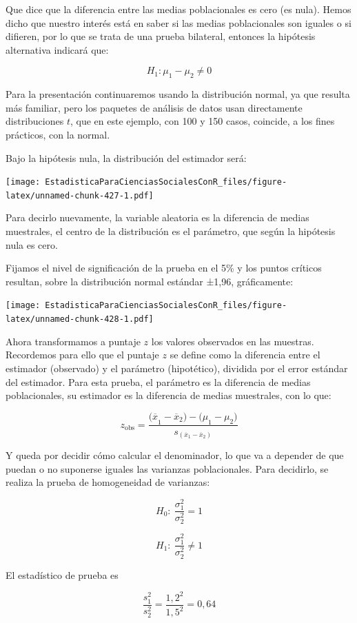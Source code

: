 \documentclass[]{book}
\begin{document}
Que dice que la diferencia entre las medias poblacionales es cero (es
nula). Hemos dicho que nuestro interés está en saber si las medias
poblacionales son iguales o si difieren, por lo que se trata de una
prueba bilateral, entonces la hipótesis alternativa indicará que:

\[H_{1}:\mu_{1} - \mu_{2} \neq 0\]

Para la presentación continuaremos usando la distribución normal, ya que resulta más familiar, pero los paquetes de análisis de datos usan
directamente distribuciones \(t\), que en este ejemplo, con 100 y 150 casos, coincide, a los fines prácticos, con la normal.

Bajo la hipótesis nula, la distribución del estimador será:

\texttt{[image: EstadisticaParaCienciasSocialesConR\_files/figure-latex/unnamed-chunk-427-1.pdf]}

Para decirlo nuevamente, la variable aleatoria es la diferencia de
medias muestrales, el centro de la distribución es el parámetro, que
según la hipótesis nula es cero.

Fijamos el nivel de significación de la prueba en el 5\% y los puntos
críticos resultan, sobre la distribución normal estándar ±1,96,
gráficamente:

\texttt{[image: EstadisticaParaCienciasSocialesConR\_files/figure-latex/unnamed-chunk-428-1.pdf]}

Ahora transformamos a puntaje \(z\) los valores observados en las
muestras. Recordemos para ello que el puntaje \(z\) se define como la
diferencia entre el estimador (observado) y el parámetro (hipotético), dividida por el error
estándar del estimador. Para esta prueba, el parámetro es la diferencia
de medias poblacionales, su estimador es la diferencia de medias
muestrales, con lo que:

\[z_{\text{obs}} = \frac{{(\overline{x}}_{1} - {\overline{x}}_{2}) - {(\mu}_{1} - \mu_{2})}{s_{({\overline{x}}_{1} - {\overline{x}}_{2})}}\]

Y queda por decidir cómo calcular el denominador, lo que va a depender
de que puedan o no suponerse iguales las varianzas poblacionales. Para
decidirlo, se realiza la prueba de homogeneidad de varianzas:

\[H_{0}:\ \frac{\sigma_{1}^{2}}{\sigma_{2}^{2}} = 1\]

\[H_{1}:\ \frac{\sigma_{1}^{2}}{\sigma_{2}^{2}} \neq 1\]

El estadístico de prueba es

\[\frac{s_{1}^{2}}{s_{2}^{2}} = \frac{{1,2}^{2}}{{1,5}^{2}} = 0,64\]
\end{document}
